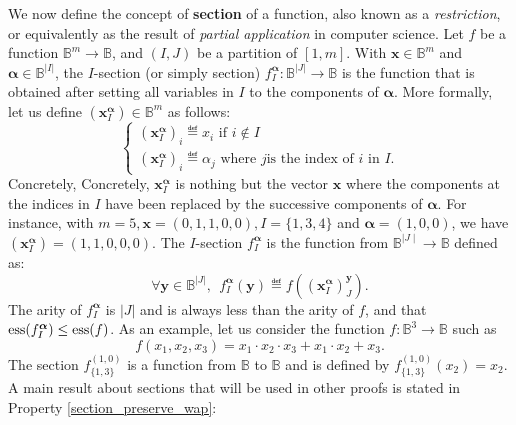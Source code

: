 We now define the concept of \textbf{section} of a function, also known as a
\textit{restriction}, or equivalently as the result of \textit{partial
application} in computer science. Let $f$ be a function $\mathbb{B}^m\to
\mathbb{B}$, and $(I, J)$ be a partition of $[1, m]$. With $\mathbf{x} \in
\mathbb{B}^m$ and $\boldsymbol{\alpha} \in \mathbb{B}^{|I|}$, the $I$-section
(or simply section) $f^{\boldsymbol{\alpha}}_I \colon \mathbb{B}^{|J|} \to
\mathbb{B}$ is the function that is obtained after setting all variables in $I$
to the components of $\boldsymbol{\alpha}$.  More formally, let us define
$(\mathbf{x}^{\boldsymbol{\alpha}}_I) \in \mathbb{B}^m$ as follows:
$$
\begin{cases}
(\mathbf{x}^{\boldsymbol{\alpha}}_I)_i \eqdef x_i \mbox{ if } i \notin I\\
(\mathbf{x}^{\boldsymbol{\alpha}}_I)_i \eqdef \alpha_j \mbox{ where } j \mbox{
  is the index of } i \mbox{ in } I.
\end{cases}
$$
Concretely, Concretely, $\mathbf{x}^{\boldsymbol{\alpha}}_I$ is nothing but the vector $\mathbf{x}$
where the components at the  indices in $I$ have been replaced by the
successive components of $\boldsymbol{\alpha}$. For instance, with $m=5,
\mathbf{x}=(0,1,1,0,0), I=\{1,3,4\}$ and $\boldsymbol{\alpha}=(1,0,0)$, we
have $(\mathbf{x}^{\boldsymbol{\alpha}}_I)=(1,1,0,0,0)$.  The $I$-section
$f^{\boldsymbol{\alpha}}_I$ is the function from $\mathbb{B}^{\mid J \mid} \to
\mathbb{B}$ defined as:
$$\forall \mathbf{y} \in \mathbb{B}^{|J|},~~
f^{\boldsymbol{\alpha}}_I(\mathbf{y}) \eqdef
f((\mathbf{x}^{\boldsymbol{\alpha}}_I)^\mathbf{y}_J).$$
The arity of $f^{\boldsymbol{\alpha}}_I$ is $|J|$ and is always less
than the arity of $f$, and that
$\operatorname{ess}(f^{\boldsymbol{\alpha}}_I) \leq \operatorname{ess}(f)$.  As an example, let us consider
the function $f\colon \mathbb{B}^3 \to \mathbb{B}$ such as
$$f(x_1,x_2, x_3) = x_1 \cdot x_2 \cdot x_3 + x_1 \cdot x_2 + x_3.$$
The section $f^{(1, 0)}_{\{1, 3\}}$ is a function from $\mathbb{B}$ to
$\mathbb{B}$ and is defined by $f^{(1, 0)}_{\{1, 3\}}(x_2) = x_2$.
A main result about sections that will be used in other proofs is stated in
Property \ref{section_preserve_wap}:

